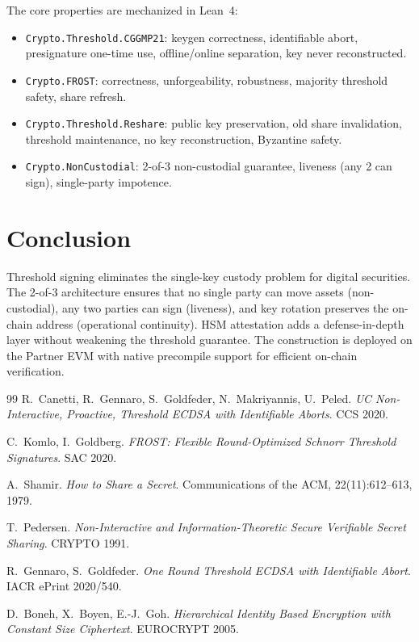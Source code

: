 \documentclass[11pt,a4paper]{article}
\begin{document}
The core properties are mechanized in Lean~4:

\begin{itemize}[nosep]
  \item \texttt{Crypto.Threshold.CGGMP21}: keygen correctness,
        identifiable abort, presignature one-time use, offline/online
        separation, key never reconstructed.
  \item \texttt{Crypto.FROST}: correctness, unforgeability, robustness,
        majority threshold safety, share refresh.
  \item \texttt{Crypto.Threshold.Reshare}: public key preservation,
        old share invalidation, threshold maintenance, no key
        reconstruction, Byzantine safety.
  \item \texttt{Crypto.NonCustodial}: 2-of-3 non-custodial guarantee,
        liveness (any 2 can sign), single-party impotence.
\end{itemize}

\section{Conclusion}
\label{sec:conclusion}

Threshold signing eliminates the single-key custody problem for digital
securities.  The 2-of-3 architecture ensures that no single party can
move assets (non-custodial), any two parties can sign (liveness), and
key rotation preserves the on-chain address (operational continuity).
HSM attestation adds a defense-in-depth layer without weakening the
threshold guarantee.  The construction is deployed on the Partner EVM
with native precompile support for efficient on-chain verification.

\begin{thebibliography}{99}
R.~Canetti, R.~Gennaro, S.~Goldfeder, N.~Makriyannis, U.~Peled.
\emph{UC Non-Interactive, Proactive, Threshold ECDSA with Identifiable
Aborts}.
CCS 2020.

C.~Komlo, I.~Goldberg.
\emph{FROST: Flexible Round-Optimized Schnorr Threshold Signatures}.
SAC 2020.

A.~Shamir.
\emph{How to Share a Secret}.
Communications of the ACM, 22(11):612--613, 1979.

T.~Pedersen.
\emph{Non-Interactive and Information-Theoretic Secure Verifiable
Secret Sharing}.
CRYPTO 1991.

R.~Gennaro, S.~Goldfeder.
\emph{One Round Threshold ECDSA with Identifiable Abort}.
IACR ePrint 2020/540.

D.~Boneh, X.~Boyen, E.-J.~Goh.
\emph{Hierarchical Identity Based Encryption with Constant Size
Ciphertext}.
EUROCRYPT 2005.
\end{thebibliography}
\end{document}
